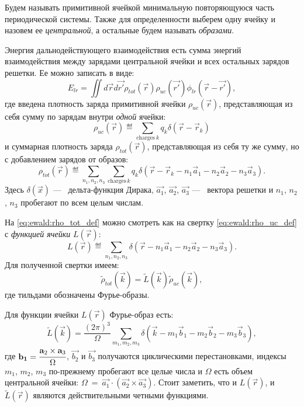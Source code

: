 Будем называть примитивной ячейкой минимальную повторяющуюся часть периодической системы.
Также для определенности выберем одну ячейку и назовем ее \textit{центральной}, а остальные будем называть \textit{образами}.

Энергия дальнодействующего взаимодействия есть сумма энергий взаимодействия между зарядами центральной ячейки и всех остальных зарядов решетки.
Ее можно записать в виде:
\begin{equation}
    \label{eq:ewald:energy_lr}
    E_{lr}=\iint d \vec{r} d \vec{r'} \rho_{tot}(\vec{r}) \rho_{u c}\left(\vec{r'}\right) \phi_{lr}\left(\vec{r}-\vec{r'}\right),
\end{equation}
где введена плотность заряда примитивной ячейки $\rho_{uc} (\vec{r})$, представляющая из себя сумму по зарядам внутри \textit{одной} ячейки:
\begin{equation}
    \label{eq:ewald:rho_uc_def}
    \rho_{uc}(\vec{r}) \eqdef \sum_{\text{charges}\ k} q_{k} \delta\left(\vec{r}-\vec{r}_{k}\right)
\end{equation}
и суммарная плотность заряда $\rho_{tot}(\vec{r})$, представляющая из себя ту же сумму, но с добавлением зарядов от образов:
\begin{equation}
    \label{eq:ewald:rho_tot_def}
    \rho_{tot}(\vec{r}) \eqdef \sum_{n_{1}, n_{2}, n_{3}} \sum_{\text{charges}\,k} q_{k} \delta\left(\vec{r}-\vec{r}_{k}-n_{1} \vec{a}_{1}-n_{2} \vec{a}_{2}-n_{3} \vec{a}_{3}\right).
\end{equation}
Здесь $\delta (\vec{x})$ ---~ дельта-функция Дирака, $\vec{a_1}$, $\vec{a_2}$, $\vec{a_3}$ ---~ вектора решетки и $n_1$, $n_2$, $n_3$ пробегают по всем целым числам.

На \eqref{eq:ewald:rho_tot_def} можно смотреть как на свертку \eqref{eq:ewald:rho_uc_def} с \textit{функцией ячейки} $L (\vec{r})$:
\begin{equation}
    \label{eq:ewald:lattice_function_def}
    L(\vec{r}) \eqdef \sum_{n_{1}, n_{2}, n_{3}} \delta\left(\vec{r}-n_{1} \vec{a}_{1}-n_{2} \vec{a}_{2}-n_{3} \vec{a}_{3}\right).
\end{equation}
Для полученной свертки имеем:
\begin{equation}
    \label{eq:ewald:rho_tot_conv_prod}
    \tilde{\rho}_{tot}(\vec{k}) = \tilde{L}(\vec{k}) \tilde{\rho}_{u c}(\vec{k}),
\end{equation}
где тильдами обозначены Фурье-образы.

Для функции ячейки $L(\vec{r})$ Фурье-образ есть:
\begin{equation}
    \label{eq:ewald:lattice_function_image}
    \tilde{L}(\vec{k})=\frac{(2 \pi)^{3}}{\Omega} \sum_{m_{1}, m_{2}, m_{3}} \delta\left(\vec{k}-m_{1} \vec{b}_{1}-m_{2} \vec{b}_{2}-m_{3} \vec{b}_{3}\right),
\end{equation}
где $\vec{b_1} = \cfrac{\vec{a}_{2} \times \vec{a}_{3}}{\Omega}$, $\vec{b_2}$ и $\vec{b_3}$ получаются циклическими перестановками, индексы $m_1$, $m_2$, $m_3$ по-прежнему пробегают все целые числа и $\Omega$ есть объем центральной ячейки: $\Omega~=~\vec{a_1} \cdot (\vec{a_2} \times \vec{a_3})$.
Стоит заметить, что и $L (\vec{r})$, и $\tilde{L} (\vec{r})$ являются действительными четными функциями.


